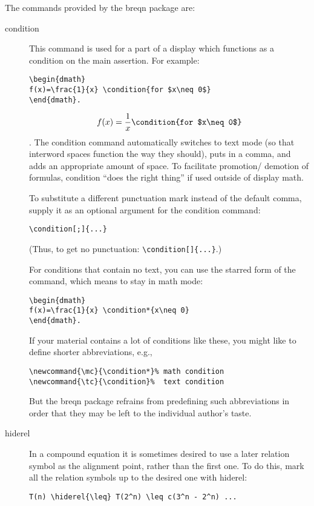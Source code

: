 \documentclass{article}
\newcommand{\ntt}{\normalfont\ttfamily}
\DeclareRobustCommand{\cs}[1]{{\ntt\ttbackslash#1}}
\let\cn=\cs
\DeclareRobustCommand{\pkg}[1]{{\ntt#1}}
\newcommand\thepkg[1]{the \pkg{breqn} package}
\providecommand{\qq}[1]{\textquotedblleft#1\textquotedblright}
\begin{document}
The commands provided by \thepkg/ are:
\begin{description}
\item[\cn{condition}] This command is used for
a part of a display which functions as a condition on the main
assertion. For example:
\begin{verbatim}
\begin{dmath}
f(x)=\frac{1}{x} \condition{for $x\neq 0$}
\end{dmath}.
\end{verbatim}
\begin{dmath}
f(x)=\frac{1}{x} \condition{for $x\neq 0$}
\end{dmath}.
The \cn{condition} command automatically switches to text mode (so that
interword spaces function the way they should), puts in a comma, and
adds an appropriate amount of space. To facilitate promotion\slash
demotion of formulas, \cn{condition} \qq{does the right thing} if used
outside of display math.

To substitute a different punctuation mark instead of the default comma,
supply it as an optional argument for the \cn{condition} command:
\begin{verbatim}
\condition[;]{...}
\end{verbatim}
(Thus, to get no punctuation: \verb'\condition[]{...}'.)

For conditions that contain no text, you can use the starred form of the
command, which means to stay in math mode:
\begin{verbatim}
\begin{dmath}
f(x)=\frac{1}{x} \condition*{x\neq 0}
\end{dmath}.
\end{verbatim}

If your material contains a lot of conditions like these, you might like
to define shorter abbreviations, e.g.,
\begin{verbatim}
\newcommand{\mc}{\condition*}% math condition
\newcommand{\tc}{\condition}%  text condition
\end{verbatim}
But \thepkg/ refrains from predefining such abbreviations in order that
they may be left to the individual author's taste.

\item[\cn{hiderel}] In a compound equation it is sometimes desired to
use a later relation symbol as the alignment point, rather than the
first one. To do this, mark all the relation symbols up to the desired
one with \cn{hiderel}:
\begin{verbatim}
T(n) \hiderel{\leq} T(2^n) \leq c(3^n - 2^n) ...
\end{verbatim}
\end{description}
\end{document}
